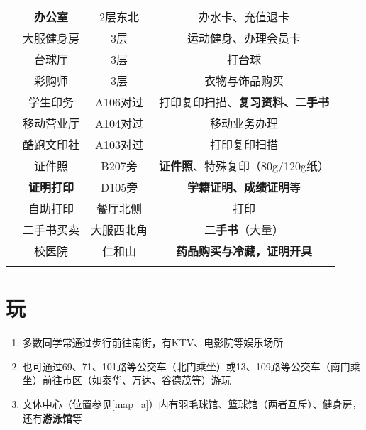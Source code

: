 \begin{table}[H]
\begin{tabular}{|c|c|c|c|}
                              & \textbf{办公室}          & 2层东北   & 办水卡、充值退卡                     \\
        \cline{2-4}
                              & 大服健身房   \footnotemark & 3层     & 运动健身、办理会员卡                   \\
        \cline{2-4}
                              & 台球厅                   & 3层     & 打台球                          \\
        \cline{2-4}
                              & 彩购师                   & 3层     & 衣物与饰品购买                      \\
        \Xhline{1.2pt}
        \multirow{3}{*}{中和广场} & 学生印务                  & A106对过 & 打印复印扫描、\textbf{复习资料、二手书}     \\
        \cline{2-4}
                              & 移动营业厅                 & A104对过 & 移动业务办理                       \\
        \cline{2-4}
                              & 酷跑文印社                 & A103对过 & 打印复印扫描                       \\
        \Xhline{1.2pt}
        \multirow{5}{*}{其他}   & 证件照                   & B207旁  & \textbf{证件照}、特殊复印（80g/120g纸） \\
        \cline{2-4}
                              & \textbf{证明打印}         & D105旁  & \textbf{学籍证明、成绩证明}等          \\
        \cline{2-4}
                              & 自助打印                  & 餐厅北侧   & 打印                           \\
        \cline{2-4}
                              & 二手书买卖                 & 大服西北角  & \textbf{二手书}（大量）             \\
        \cline{2-4}
                              & 校医院                   & 仁和山    & \textbf{药品购买与冷藏，证明开具}        \\
        \Xhline{1.2pt}
    \end{tabular}
\end{table}

\section[玩]{玩}
\begin{enumerate}
    \item 多数同学常通过步行前往南街，有KTV、电影院等娱乐场所
    \item 也可通过69、71、101路等公交车（北门乘坐）或13、109路等公交车（南门乘坐）前往市区（如泰华、万达、谷德茂等）游玩
    \item 文体中心（位置参见\uline{\ref{map_a}}）内有羽毛球馆、篮球馆（两者互斥）、健身房，还有\textbf{游泳馆}等\footnotemark
\end{enumerate}

